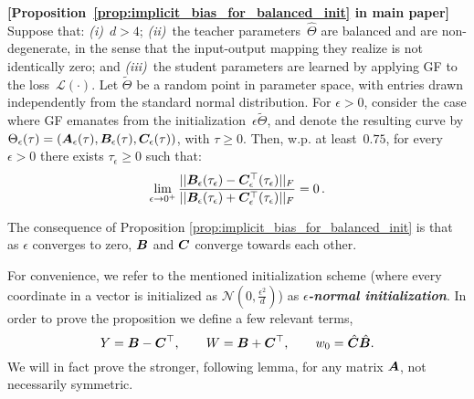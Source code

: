 
\begin{proposition}\textbf{[Proposition~\ref{prop:implicit_bias_for_balanced_init} in main paper]} 
Suppose that:
\emph{(i)}~$d > 4$;
\emph{(ii)}~the teacher parameters~$\hat{\Theta}$ are balanced and are non-degenerate, in the sense that the input-output mapping they realize is not identically zero;
and 
\emph{(iii)}~the student parameters are learned by applying GF to the loss~$\mathcal{L} ( \cdot )$.
Let $\tilde{\Theta}$ be a random point in parameter space, with entries drawn independently from the standard normal distribution.
For $\epsilon > 0$, consider the case where GF emanates from the initialization~$\epsilon \tilde{\Theta}$, and denote the resulting curve by $\Theta_\epsilon ( \tau ) = ( {\bm{A}}_\epsilon ( \tau ) , {\bm{B}}_\epsilon ( \tau ) , {\bm{C}}_\epsilon ( \tau ) )$, with $\tau \geq 0$.
Then, w.p. at least~$0.75$, for every $\epsilon > 0$ there exists $\tau_\epsilon \geq 0$ such that:
\begin{equation}
    \lim_{\epsilon\rightarrow 0^+}\frac{||{\bm{B}}_{\epsilon}(\tau_\epsilon) - {\bm{C}}_{\epsilon}^\top(\tau_\epsilon) ||_F}{||{\bm{B}}_{\epsilon}(\tau_\epsilon) + {\bm{C}}_{\epsilon}^\top(\tau_\epsilon) ||_F}=0
    \text{\,.}
\end{equation}

\end{proposition}

The consequence of Proposition \ref{prop:implicit_bias_for_balanced_init} is that as $\epsilon$ converges to zero, ${\bm{B}}$ and ${\bm{C}}$ converge towards each other. 

For convenience, we refer to the mentioned initialization scheme (where every coordinate in a vector is initialized as $\mathcal{N}\left(0,\frac{\epsilon^2}{d}\right)$) as \textit{\textbf{$\epsilon$-normal initialization}}.
In order to prove the proposition we define a few relevant terms, 
\begin{equation}
    Y = {\bm{B}} - {\bm{C}}^\top,\qquad W = {\bm{B}} + {\bm{C}}^\top,\qquad w_0=\hat{{\bm{C}}}\hat{{\bm{B}}}.
\end{equation}
 We will in fact prove the stronger, following lemma, for any matrix ${\bm{A}}$, not necessarily symmetric.

